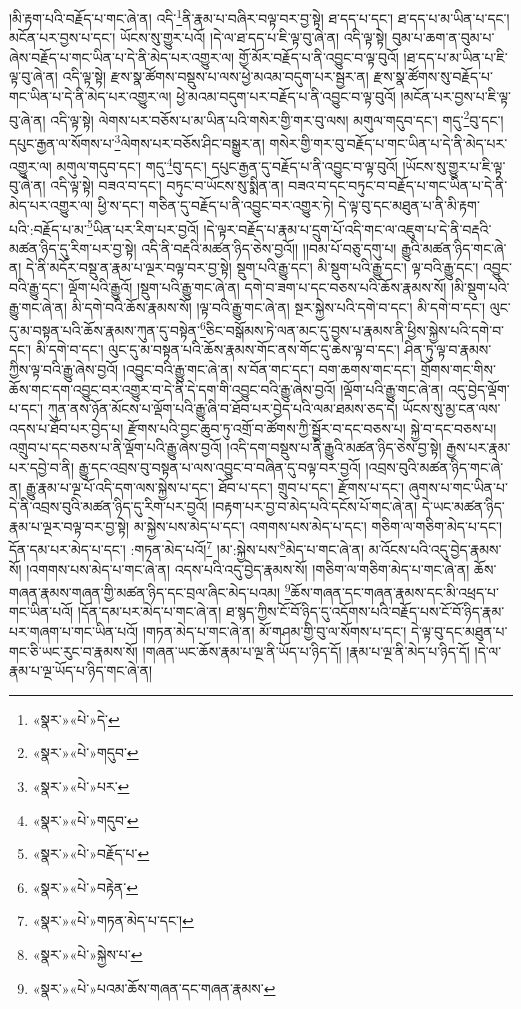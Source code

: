 །མི་རྟག་པའི་བརྗོད་པ་གང་ཞེ་ན། འདི་\footnote{«སྣར་»«པེ་»དེ་}ནི་རྣམ་པ་བཞིར་བལྟ་བར་བྱ་སྟེ། ཐ་དད་པ་དང་། ཐ་དད་པ་མ་ཡིན་པ་དང་། མངོན་པར་བྱས་པ་དང་། ཡོངས་སུ་གྱུར་པའོ། །དེ་ལ་ཐ་དད་པ་ཇི་ལྟ་བུ་ཞེ་ན། འདི་ལྟ་སྟེ། བུམ་པ་ཆག་ན་བུམ་པ་ཞེས་བརྗོད་པ་གང་ཡིན་པ་དེ་ནི་མེད་པར་འགྱུར་ལ། གྱོ་མོར་བརྗོད་པ་ནི་འབྱུང་བ་ལྟ་བུའོ། །ཐ་དད་པ་མ་ཡིན་པ་ཇི་ལྟ་བུ་ཞེ་ན། འདི་ལྟ་སྟེ། རྫས་སྣ་ཚོགས་བསྡུས་པ་ལས་ཕྱེ་མའམ་བདུག་པར་སྦྱར་ན། རྫས་སྣ་ཚོགས་སུ་བརྗོད་པ་གང་ཡིན་པ་དེ་ནི་མེད་པར་འགྱུར་ལ། ཕྱེ་མའམ་བདུག་པར་བརྗོད་པ་ནི་འབྱུང་བ་ལྟ་བུའོ། །མངོན་པར་བྱས་པ་ཇི་ལྟ་བུ་ཞེ་ན། འདི་ལྟ་སྟེ། ལེགས་པར་བཅོས་པ་མ་ཡིན་པའི་གསེར་གྱི་གར་བུ་ལས། མགུལ་གདུབ་དང་། གདུ་\footnote{«སྣར་»«པེ་»གདུབ་}བུ་དང་། དཔུང་རྒྱན་ལ་སོགས་པ་\footnote{«སྣར་»«པེ་»པར་}ལེགས་པར་བཅོས་ཤིང་བསྒྱུར་ན། གསེར་གྱི་གར་བུ་བརྗོད་པ་གང་ཡིན་པ་དེ་ནི་མེད་པར་འགྱུར་ལ། མགུལ་གདུབ་དང་། གདུ་\footnote{«སྣར་»«པེ་»གདུབ་}བུ་དང་། དཔུང་རྒྱན་དུ་བརྗོད་པ་ནི་འབྱུང་བ་ལྟ་བུའོ། །ཡོངས་སུ་གྱུར་པ་ཇི་ལྟ་བུ་ཞེ་ན། འདི་ལྟ་སྟེ། བཟའ་བ་དང་། བཏུང་བ་ཡོངས་སུ་སྨིན་ན། བཟའ་བ་དང་བཏུང་བ་བརྗོད་པ་གང་ཡིན་པ་དེ་ནི་མེད་པར་འགྱུར་ལ། ཕྱི་ས་དང་། གཅིན་དུ་བརྗོད་པ་ནི་འབྱུང་བར་འགྱུར་ཏེ། དེ་ལྟ་བུ་དང་མཐུན་པ་ནི་མི་རྟག་པའི་:བརྗོད་པ་མ་\footnote{«སྣར་»«པེ་»བརྗོད་པ་}ཡིན་པར་རིག་པར་བྱའོ། །དེ་ལྟར་བརྗོད་པ་རྣམ་པ་དྲུག་པོ་འདི་གང་ལ་འཇུག་པ་དེ་ནི་བརྡའི་མཚན་ཉིད་དུ་རིག་པར་བྱ་སྟེ། འདི་ནི་བརྡའི་མཚན་ཉིད་ཅེས་བྱའོ།། །།བམ་པོ་བཅུ་དགུ་པ། རྒྱུའི་མཚན་ཉིད་གང་ཞེ་ན། དེ་ནི་མདོར་བསྡུ་ན་རྣམ་པ་ལྔར་བལྟ་བར་བྱ་སྟེ། སྡུག་པའི་རྒྱུ་དང་། མི་སྡུག་པའི་རྒྱུ་དང་། ལྟ་བའི་རྒྱུ་དང་། འབྱུང་བའི་རྒྱུ་དང་། ལྡོག་པའི་རྒྱུའོ། །སྡུག་པའི་རྒྱུ་གང་ཞེ་ན། དགེ་བ་ཟག་པ་དང་བཅས་པའི་ཆོས་རྣམས་སོ། །མི་སྡུག་པའི་རྒྱུ་གང་ཞེ་ན། མི་དགེ་བའི་ཆོས་རྣམས་སོ། །ལྟ་བའི་རྒྱུ་གང་ཞེ་ན། སྔར་སྐྱེས་པའི་དགེ་བ་དང་། མི་དགེ་བ་དང་། ལུང་དུ་མ་བསྟན་པའི་ཆོས་རྣམས་ཀུན་དུ་བསྟེན་\footnote{«སྣར་»«པེ་»བརྟེན་}ཅིང་བསྒོམས་ཏེ་ལན་མང་དུ་བྱས་པ་རྣམས་ནི་ཕྱིས་སྐྱེས་པའི་དགེ་བ་དང་། མི་དགེ་བ་དང་། ལུང་དུ་མ་བསྟན་པའི་ཆོས་རྣམས་གོང་ནས་གོང་དུ་ཆེས་ལྟ་བ་དང་། ཤིན་ཏུ་ལྟ་བ་རྣམས་ཀྱིས་ལྟ་བའི་རྒྱུ་ཞེས་བྱའོ། །འབྱུང་བའི་རྒྱུ་གང་ཞེ་ན། ས་བོན་གང་དང་། བག་ཆགས་གང་དང་། གྲོགས་གང་གིས་ཆོས་གང་དག་འབྱུང་བར་འགྱུར་བ་དེ་ནི་དེ་དག་གི་འབྱུང་བའི་རྒྱུ་ཞེས་བྱའོ། །ལྡོག་པའི་རྒྱུ་གང་ཞེ་ན། འདུ་བྱེད་ལྡོག་པ་དང་། ཀུན་ནས་ཉོན་མོངས་པ་ལྡོག་པའི་རྒྱུ་ཞི་བ་ཐོབ་པར་བྱེད་པའི་ལམ་ཐམས་ཅད་དེ། ཡོངས་སུ་མྱ་ངན་ལས་འདས་པ་ཐོབ་པར་བྱེད་པ། རྫོགས་པའི་བྱང་ཆུབ་ཏུ་འགྲོ་བ་ཚོགས་ཀྱི་སྦྱོར་བ་དང་བཅས་པ། སྐྱེ་བ་དང་བཅས་པ། འགྲུབ་པ་དང་བཅས་པ་ནི་ལྡོག་པའི་རྒྱུ་ཞེས་བྱའོ། །འདི་དག་བསྡུས་པ་ནི་རྒྱུའི་མཚན་ཉིད་ཅེས་བྱ་སྟེ། རྒྱས་པར་རྣམ་པར་དབྱེ་བ་ནི། རྒྱུ་དང་འབྲས་བུ་བསྟན་པ་ལས་འབྱུང་བ་བཞིན་དུ་བལྟ་བར་བྱའོ། །འབྲས་བུའི་མཚན་ཉིད་གང་ཞེ་ན། རྒྱུ་རྣམ་པ་ལྔ་པོ་འདི་དག་ལས་སྐྱེས་པ་དང་། ཐོབ་པ་དང་། གྲུབ་པ་དང་། རྫོགས་པ་དང་། ཞུགས་པ་གང་ཡིན་པ་དེ་ནི་འབྲས་བུའི་མཚན་ཉིད་དུ་རིག་པར་བྱའོ། །བརྟག་པར་བྱ་བ་མེད་པའི་དངོས་པོ་གང་ཞེ་ན། དེ་ཡང་མཚན་ཉིད་རྣམ་པ་ལྔར་བལྟ་བར་བྱ་སྟེ། མ་སྐྱེས་པས་མེད་པ་དང་། འགགས་པས་མེད་པ་དང་། གཅིག་ལ་གཅིག་མེད་པ་དང་། དོན་དམ་པར་མེད་པ་དང་། :གཏན་མེད་པའོ།\footnote{«སྣར་»«པེ་»གཏན་མེད་པ་དང་།} །མ་:སྐྱེས་པས་\footnote{«སྣར་»«པེ་»སྐྱེས་པ་}མེད་པ་གང་ཞེ་ན། མ་འོངས་པའི་འདུ་བྱེད་རྣམས་སོ། །འགགས་པས་མེད་པ་གང་ཞེ་ན། འདས་པའི་འདུ་བྱེད་རྣམས་སོ། །གཅིག་ལ་གཅིག་མེད་པ་གང་ཞེ་ན། ཆོས་གཞན་རྣམས་གཞན་གྱི་མཚན་ཉིད་དང་བྲལ་ཞིང་མེད་པའམ། \footnote{«སྣར་»«པེ་»པའམ་ཆོས་གཞན་དང་གཞན་རྣམས་}ཆོས་གཞན་དང་གཞན་རྣམས་དང་མི་འཕྲད་པ་གང་ཡིན་པའོ། །དོན་དམ་པར་མེད་པ་གང་ཞེ་ན། ཐ་སྙད་ཀྱིས་ངོ་བོ་ཉིད་དུ་འདོགས་པའི་བརྗོད་པས་ངོ་བོ་ཉིད་རྣམ་པར་གཞག་པ་གང་ཡིན་པའོ། །གཏན་མེད་པ་གང་ཞེ་ན། མོ་གཤམ་གྱི་བུ་ལ་སོགས་པ་དང་། དེ་ལྟ་བུ་དང་མཐུན་པ་གང་ཅི་ཡང་རུང་བ་རྣམས་སོ། །གཞན་ཡང་ཆོས་རྣམ་པ་ལྔ་ནི་ཡོད་པ་ཉིད་དོ། །རྣམ་པ་ལྔ་ནི་མེད་པ་ཉིད་དོ། །དེ་ལ་རྣམ་པ་ལྔ་ཡོད་པ་ཉིད་གང་ཞེ་ན། 